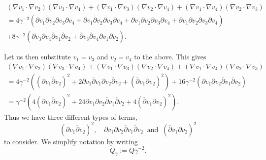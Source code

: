 \documentclass[12pt]{amsart}
\def\p{\partial}
\theoremstyle{definition}
\theoremstyle{remark}
\begin{document}
\begin{multline*}
(\nabla v_1\cdot \nabla v_2)(\nabla v_3\cdot\nabla v_4)+(\nabla v_1\cdot\nabla v_3)(\nabla v_2\cdot\nabla v_4)+(\nabla v_1\cdot\nabla v_4)(\nabla v_2\cdot\nabla v_3)\\[5pt]
=4\gamma^{-2}(\partial v_1\bar\partial v_2\partial v_3\bar\partial v_4
+\partial v_1\bar\partial v_2\bar\partial v_3\partial v_4
+\bar\partial v_1\partial v_2\partial v_3\bar\partial v_4
+\bar\partial v_1\partial v_2\bar\partial v_3\partial v_4) \\
+ 8\gamma^{-2}\left( \partial v_3\partial v_4\bar\partial v_1\bar\partial v_2
+\bar\partial v_3\bar\partial v_4\partial v_1\partial v_2\right).
\end{multline*}

Let us then substitute $v_1=v_3$ and $v_2=v_4$ to the above. This gives
\begin{multline*}
 (\nabla v_1\cdot \nabla v_2)(\nabla v_3\cdot\nabla v_4)+(\nabla v_1\cdot\nabla v_3)(\nabla v_2\cdot\nabla v_4)+(\nabla v_1\cdot\nabla v_4)(\nabla v_2\cdot\nabla v_3) \\
 =4\gamma^{-2}((\p v_1\overline \p v_2)^2+2\p v_1\overline \p v_1 \p v_2 \overline \p v_2 + (\overline \p v_1\p v_2)^2)+ 16\gamma^{-2}(\p v_1 \p v_2 \overline \p v_1 \overline \p v_2) \\
 =\gamma^{-2}(4(\p v_1\overline \p v_2)^2 + 24 \p v_1 \p v_2 \overline \p v_1 \overline \p v_2 + 4 (\overline \p v_1\p v_2)^2).
\end{multline*}
Thus we have three different types of terms,
\[
 (\p v_1\overline \p v_2)^2, \quad \p v_1 \p v_2 \overline \p v_1 \overline \p v_2 \ \text{ and } \ (\overline \p v_1\p v_2)^2
\]
to consider. We simplify notation by writing 
\[
Q_\gamma:=Q\gamma^{-2}. 
\]
\end{document}
